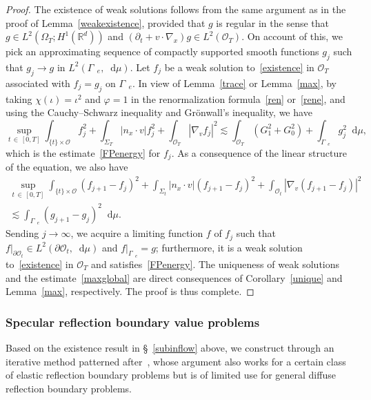 \documentclass[AHL,Unicode,longabstracts,published]{cedram}
\newcommand*{\dif}{\mathop{}\!\mathrm{d}}
\newcommand*\p{\partial}
\newcommand*\R {\mathbb{R}}
\newcommand*\Ge {\Gamma_{\;\!\!\;\!\!e}}
\newcommand*\OO {\mathcal{O}}
\begin{document}
\begin{proof}
The existence of weak solutions follows from the same argument as in the proof of Lemma~\ref{weakexistence}, provided that $g$ is regular in the sense that $g\in L^2(\Omega_T;H^1(\R^d))$ and $(\p_t+v\cdot\nabla_x)g\in L^2(\OO_T)$. On account of this, we pick an approximating sequence of compactly supported smooth functions $g_j$ such that $g_j\rightarrow g$ in $L^2(\Ge,\dif\mu)$. Let $f_j$ be a weak solution to~\eqref{existence} in $\OO_T$ associated with $f_j=g_j$ on $\Ge$. In view of Lemma~\ref{trace} or Lemma~\ref{max}, by taking $\chi(\iota)=\iota^2$ and $\varphi=1$ in the renormalization formula~\eqref{ren} or~\eqref{rene}, and using the Cauchy--Schwarz inequality and Gr\"onwall's inequality, we have
\[
\sup_{t\,\in\,[0,T]}\int_{\{t\}\times\OO}f_j^2 +\int_{\Sigma_T} |n_x\cdot v| f_j^2 +\int_{\OO_T}
\left|\nabla_vf_j\right|^2
\lesssim \int_{\OO_T}\left(G_1^2+G_0^2\right) +\int_{\Ge}g_j^2\dif\mu,
\]
which is the estimate~\eqref{FPenergy} for $f_j$. As a consequence of the linear structure of the equation, we also have
\begin{multline*}
\sup_{t\,\in\,[0,T]}\int_{\{t\}\times\OO}\left(f_{j+1}-f_{j}\right)^2 +\int_{\Sigma_t} |n_x\cdot v| \left(f_{j+1}-f_{j}\right)^2 +\int_{\OO_t}\left|\nabla_v\left(f_{j+1}-f_{j}\right)\right|^2\\
\lesssim \int_{\Ge}\left(g_{j+1}-g_{j}\right)^2\dif\mu.
\end{multline*}
Sending $j\rightarrow\infty$, we acquire a limiting function $f$ of $f_j$ such that $f|_{\p\OO_t}\in L^2(\p\OO_t,\dif\mu)$ and $f|_{\Ge}=g$; furthermore, it is a weak solution to~\eqref{existence} in $\OO_T$ and satisfies~\eqref{FPenergy}. The uniqueness of weak solutions and the estimate~\eqref{maxglobal} are direct consequences of Corollary~\ref{unique} and Lemma~\ref{max}, respectively. The proof is thus complete.
\end{proof}

\subsubsection{Specular reflection boundary value problems}

Based on the existence result in \S~\ref{subinflow} above, we construct through an iterative method patterned after~\cite{Carrillo}, whose argument also works for a certain class of elastic reflection boundary problems but is of limited use for general diffuse reflection boundary problems.
\end{document}
